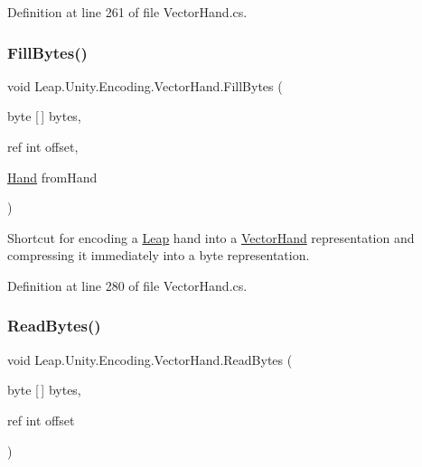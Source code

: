 Definition at line 261 of file Vector\+Hand.\+cs.

\mbox{\label{class_leap_1_1_unity_1_1_encoding_1_1_vector_hand_a3283b0824ff4862ef5a19f188432c4d2}} 
\subsubsection{\texorpdfstring{FillBytes()}{FillBytes()}\hspace{0.1cm}{\footnotesize\ttfamily [3/3]}}
{\footnotesize\ttfamily void Leap.\+Unity.\+Encoding.\+Vector\+Hand.\+Fill\+Bytes (\begin{DoxyParamCaption}\item[{byte \mbox{[}$\,$\mbox{]}}]{bytes,  }\item[{ref int}]{offset,  }\item[{\mbox{\hyperlink{class_leap_1_1_hand}{Hand}}}]{from\+Hand }\end{DoxyParamCaption})}



Shortcut for encoding a \mbox{\hyperlink{namespace_leap_1_1_unity_1_1_leap}{Leap}} hand into a \mbox{\hyperlink{class_leap_1_1_unity_1_1_encoding_1_1_vector_hand}{Vector\+Hand}} representation and compressing it immediately into a byte representation. 



Definition at line 280 of file Vector\+Hand.\+cs.

\mbox{\label{class_leap_1_1_unity_1_1_encoding_1_1_vector_hand_a06142cb2d22e73457ebfdfdbbe8329d6}} 
\subsubsection{\texorpdfstring{ReadBytes()}{ReadBytes()}\hspace{0.1cm}{\footnotesize\ttfamily [1/2]}}
{\footnotesize\ttfamily void Leap.\+Unity.\+Encoding.\+Vector\+Hand.\+Read\+Bytes (\begin{DoxyParamCaption}\item[{byte \mbox{[}$\,$\mbox{]}}]{bytes,  }\item[{ref int}]{offset }\end{DoxyParamCaption})}



